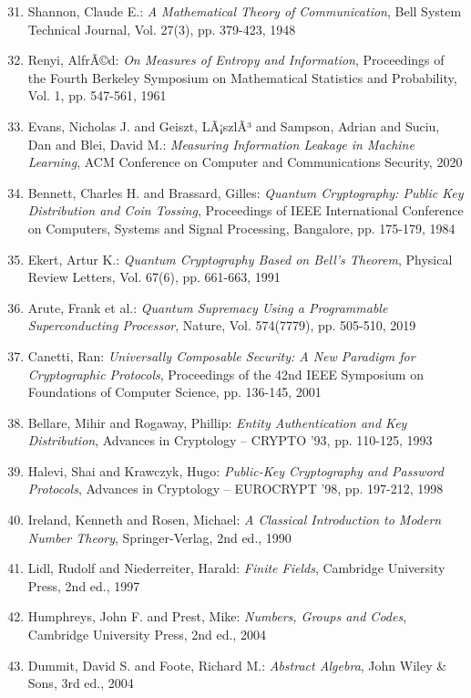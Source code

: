 ﻿\documentclass[12pt,a4paper]{article}
\begin{document}
	\begin{enumerate}
		\setcounter{enumi}{30}
		\item Shannon, Claude E.: \textit{A Mathematical Theory of Communication}, Bell System Technical Journal, Vol. 27(3), pp. 379-423, 1948
		\item Renyi, AlfrÃ©d: \textit{On Measures of Entropy and Information}, Proceedings of the Fourth Berkeley Symposium on Mathematical Statistics and Probability, Vol. 1, pp. 547-561, 1961
		\item Evans, Nicholas J. and Geiszt, LÃ¡szlÃ³ and Sampson, Adrian and Suciu, Dan and Blei, David M.: \textit{Measuring Information Leakage in Machine Learning}, ACM Conference on Computer and Communications Security, 2020
	\end{enumerate}
	
	\begin{enumerate}
		\setcounter{enumi}{33}
		\item Bennett, Charles H. and Brassard, Gilles: \textit{Quantum Cryptography: Public Key Distribution and Coin Tossing}, Proceedings of IEEE International Conference on Computers, Systems and Signal Processing, Bangalore, pp. 175-179, 1984
		\item Ekert, Artur K.: \textit{Quantum Cryptography Based on Bell's Theorem}, Physical Review Letters, Vol. 67(6), pp. 661-663, 1991
		\item Arute, Frank et al.: \textit{Quantum Supremacy Using a Programmable Superconducting Processor}, Nature, Vol. 574(7779), pp. 505-510, 2019
	\end{enumerate}
	
	\begin{enumerate}
		\setcounter{enumi}{36}
		\item Canetti, Ran: \textit{Universally Composable Security: A New Paradigm for Cryptographic Protocols}, Proceedings of the 42nd IEEE Symposium on Foundations of Computer Science, pp. 136-145, 2001
		\item Bellare, Mihir and Rogaway, Phillip: \textit{Entity Authentication and Key Distribution}, Advances in Cryptology -- CRYPTO '93, pp. 110-125, 1993
		\item Halevi, Shai and Krawczyk, Hugo: \textit{Public-Key Cryptography and Password Protocols}, Advances in Cryptology -- EUROCRYPT '98, pp. 197-212, 1998
	\end{enumerate}
	
	\begin{enumerate}
		\setcounter{enumi}{39}
		\item Ireland, Kenneth and Rosen, Michael: \textit{A Classical Introduction to Modern Number Theory}, Springer-Verlag, 2nd ed., 1990
		\item Lidl, Rudolf and Niederreiter, Harald: \textit{Finite Fields}, Cambridge University Press, 2nd ed., 1997
		\item Humphreys, John F. and Prest, Mike: \textit{Numbers, Groups and Codes}, Cambridge University Press, 2nd ed., 2004
		\item Dummit, David S. and Foote, Richard M.: \textit{Abstract Algebra}, John Wiley \& Sons, 3rd ed., 2004
	\end{enumerate}
	
\end{document}

